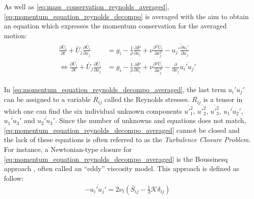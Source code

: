 \documentclass[12pt,twoside]{report}
\renewcommand \pd[2] { \frac{\partial {#1} } {\partial {#2}} }
\begin{document}
As well as \autoref{eq:mass_conservation_reynolds_averaged}, \autoref{eq:momentum_equation_reynolds_decompo} is averaged with the aim to obtain an equation which expresses the momentum conservation for the averaged motion:
\begin{align}
\begin{split}
     \pd{\bar{U}_i}{t} + \bar{U}_j  \pd{\bar{U}_i}{x_j}  &= g_i - \frac{1}{\rho} \pd{\bar{P}}{x_i} + \nu \pd{^2 \bar{U}_i}{x_j ^2} - \overline{u_j' \pd{u_i'}{x_j}} \\
    \Longleftrightarrow \pd{\bar{U}_i}{t} + \bar{U}_j  \pd{\bar{U}_i}{x_j}  &= g_i - \frac{1}{\rho} \pd{\bar{P}}{x_i} + \nu \pd{^2 \bar{U}_i}{x_j ^2} - \pd{}{x_j}\overline{u_i' u_j'} 
    \label{eq:momentum_equation_reynolds_decompo_averaged}
\end{split}
\end{align}

In \autoref{eq:momentum_equation_reynolds_decompo_averaged}, the last term ${u_i' u_j'}$ can be assigned to a variable $R_{ij}$ called the Reynolds stresses. $\overline{R_{ij}}$ is a tensor in which one can find the six individual unknown components $\overline{u'_1^2}$, $\overline{u'_2^2}$, $\overline{u'_3^2}$, $\overline{u_1'u_2'}$, $\overline{u_1'u_3'}$ and $\overline{u_2'u_3'}$. Since the number of unknowns and equations does not match, \autoref{eq:momentum_equation_reynolds_decompo_averaged} cannot be closed and the lack of these equations is often referred to as the \textsl{Turbulence Closure Problem}. \\

For instance, a Newtonian-type closure for \autoref{eq:momentum_equation_reynolds_decompo_averaged} is the Boussinesq approach \citep[see][]{boussinesq_1877}, often called an ``eddy'' viscosity model. This approach is defined as follow:
\begin{align}
    - \overline{u_i' u_j'} = 2\nu_t \left( \bar{S}_{ij} - \frac{1}{3}\mathcal{K} \delta_{ij} \right)
\end{align}
\end{document}

